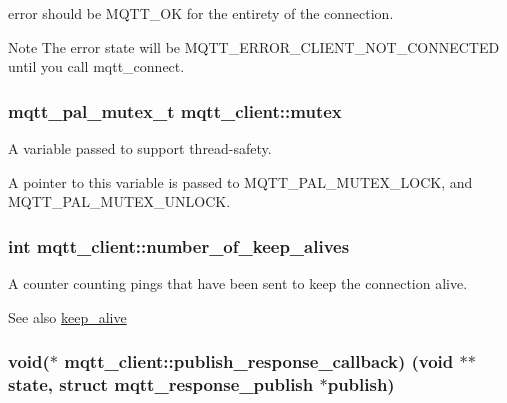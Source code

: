 error should be M\+Q\+T\+T\+\_\+\+OK for the entirety of the connection.

\begin{DoxyNote}{Note}
The error state will be M\+Q\+T\+T\+\_\+\+E\+R\+R\+O\+R\+\_\+\+C\+L\+I\+E\+N\+T\+\_\+\+N\+O\+T\+\_\+\+C\+O\+N\+N\+E\+C\+T\+ED until you call mqtt\+\_\+connect. 
\end{DoxyNote}
\subsubsection[{\texorpdfstring{mutex}{mutex}}]{\setlength{\rightskip}{0pt plus 5cm}mqtt\+\_\+pal\+\_\+mutex\+\_\+t mqtt\+\_\+client\+::mutex}\hypertarget{structmqtt__client_a885516373913fa6b50e960d50d4a5cba}{}\label{structmqtt__client_a885516373913fa6b50e960d50d4a5cba}


A variable passed to support thread-\/safety. 

A pointer to this variable is passed to {\ttfamily M\+Q\+T\+T\+\_\+\+P\+A\+L\+\_\+\+M\+U\+T\+E\+X\+\_\+\+L\+O\+CK}, and {\ttfamily M\+Q\+T\+T\+\_\+\+P\+A\+L\+\_\+\+M\+U\+T\+E\+X\+\_\+\+U\+N\+L\+O\+CK}. 
\subsubsection[{\texorpdfstring{number\+\_\+of\+\_\+keep\+\_\+alives}{number_of_keep_alives}}]{\setlength{\rightskip}{0pt plus 5cm}int mqtt\+\_\+client\+::number\+\_\+of\+\_\+keep\+\_\+alives}\hypertarget{structmqtt__client_ac23a02868e9b8c5cd2619b73ee4fcea6}{}\label{structmqtt__client_ac23a02868e9b8c5cd2619b73ee4fcea6}


A counter counting pings that have been sent to keep the connection alive. 

\begin{DoxySeeAlso}{See also}
\hyperlink{structmqtt__client_aff533344a060e58277698039f547147a}{keep\+\_\+alive} 
\end{DoxySeeAlso}
\subsubsection[{\texorpdfstring{publish\+\_\+response\+\_\+callback}{publish_response_callback}}]{\setlength{\rightskip}{0pt plus 5cm}void($\ast$ mqtt\+\_\+client\+::publish\+\_\+response\+\_\+callback) (void $\ast$$\ast$state, struct {\bf mqtt\+\_\+response\+\_\+publish} $\ast$publish)}\hypertarget{structmqtt__client_a21b907c0e4686e4ae9adf8693626c313}{}\label{structmqtt__client_a21b907c0e4686e4ae9adf8693626c313}


